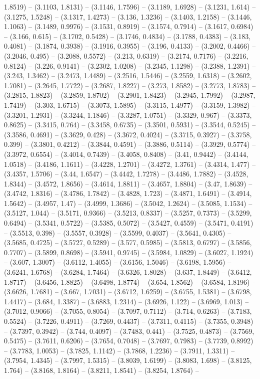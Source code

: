 1.8519) -- (3.1103, 1.8131) -- (3.1146, 1.7596) -- (3.1189, 1.6928) -- (3.1231, 1.614) -- (3.1275, 1.5248) -- (3.1317, 1.4273) -- (3.136, 1.3236) -- (3.1403, 1.2158) -- (3.1446, 1.1063) -- (3.1489, 0.9976) -- (3.1531, 0.8919) -- (3.1574, 0.7914) -- (3.1617, 0.6984) -- (3.166, 0.615) -- (3.1702, 0.5428) -- (3.1746, 0.4834) -- (3.1788, 0.4383) -- (3.183, 0.4081) -- (3.1874, 0.3938) -- (3.1916, 0.3955) -- (3.196, 0.4133) -- (3.2002, 0.4466) -- (3.2046, 0.495) -- (3.2088, 0.5572) -- (3.213, 0.6319) -- (3.2174, 0.7176) -- (3.2216, 0.8124) -- (3.226, 0.9141) -- (3.2302, 1.0208) -- (3.2345, 1.1298) -- (3.2388, 1.2391) -- (3.243, 1.3462) -- (3.2473, 1.4489) -- (3.2516, 1.5446) -- (3.2559, 1.6318) -- (3.2602, 1.7081) -- (3.2645, 1.7722) -- (3.2687, 1.8227) -- (3.273, 1.8582) -- (3.2773, 1.8783) -- (3.2815, 1.8823) -- (3.2859, 1.8702) -- (3.2901, 1.8423) -- (3.2945, 1.7992) -- (3.2987, 1.7419) -- (3.303, 1.6715) -- (3.3073, 1.5895) -- (3.3115, 1.4977) -- (3.3159, 1.3982) -- (3.3201, 1.2931) -- (3.3244, 1.1846) -- (3.3287, 1.0751) -- (3.3329, 0.967) -- (3.3373, 0.8625) -- (3.3415, 0.764) -- (3.3458, 0.6735) -- (3.3501, 0.5931) -- (3.3544, 0.5245) -- (3.3586, 0.4691) -- (3.3629, 0.428) -- (3.3672, 0.4024) -- (3.3715, 0.3927) -- (3.3758, 0.399) -- (3.3801, 0.4212) -- (3.3844, 0.4591) -- (3.3886, 0.5114) -- (3.3929, 0.5774) -- (3.3972, 0.6554) -- (3.4014, 0.7439) -- (3.4058, 0.8408) -- (3.41, 0.9442) -- (3.4144, 1.0518) -- (3.4186, 1.1611) -- (3.4228, 1.2701) -- (3.4272, 1.3761) -- (3.4314, 1.477) -- (3.4357, 1.5706) -- (3.44, 1.6547) -- (3.4442, 1.7278) -- (3.4486, 1.7882) -- (3.4528, 1.8344) -- (3.4572, 1.8656) -- (3.4614, 1.8811) -- (3.4657, 1.8804) -- (3.47, 1.8639) -- (3.4742, 1.8316) -- (3.4786, 1.7842) -- (3.4828, 1.723) -- (3.4871, 1.6491) -- (3.4914, 1.5642) -- (3.4957, 1.47) -- (3.4999, 1.3686) -- (3.5042, 1.2624) -- (3.5085, 1.1534) -- (3.5127, 1.044) -- (3.5171, 0.9366) -- (3.5213, 0.8337) -- (3.5257, 0.7373) -- (3.5299, 0.6494) -- (3.5341, 0.5722) -- (3.5385, 0.5072) -- (3.5427, 0.4559) -- (3.5471, 0.4191) -- (3.5513, 0.398) -- (3.5557, 0.3928) -- (3.5599, 0.4037) -- (3.5641, 0.4305) -- (3.5685, 0.4725) -- (3.5727, 0.5289) -- (3.577, 0.5985) -- (3.5813, 0.6797) -- (3.5856, 0.7707) -- (3.5899, 0.8698) -- (3.5941, 0.9745) -- (3.5984, 1.0829) -- (3.6027, 1.1924) -- (3.607, 1.3007) -- (3.6112, 1.4055) -- (3.6156, 1.5046) -- (3.6198, 1.5956) -- (3.6241, 1.6768) -- (3.6284, 1.7464) -- (3.6326, 1.8028) -- (3.637, 1.8449) -- (3.6412, 1.8717) -- (3.6456, 1.8825) -- (3.6498, 1.8774) -- (3.654, 1.8562) -- (3.6584, 1.8196) -- (3.6626, 1.7681) -- (3.667, 1.7031) -- (3.6712, 1.6259) -- (3.6755, 1.5381) -- (3.6798, 1.4417) -- (3.684, 1.3387) -- (3.6883, 1.2314) -- (3.6926, 1.122) -- (3.6969, 1.013) -- (3.7012, 0.9066) -- (3.7055, 0.8054) -- (3.7097, 0.7112) -- (3.714, 0.6263) -- (3.7183, 0.5524) -- (3.7226, 0.4911) -- (3.7269, 0.4437) -- (3.7311, 0.4115) -- (3.7355, 0.3948) -- (3.7397, 0.3942) -- (3.744, 0.4097) -- (3.7483, 0.441) -- (3.7525, 0.4873) -- (3.7569, 0.5475) -- (3.7611, 0.6206) -- (3.7654, 0.7048) -- (3.7697, 0.7983) -- (3.7739, 0.8992) -- (3.7783, 1.0053) -- (3.7825, 1.1142) -- (3.7868, 1.2236) -- (3.7911, 1.3311) -- (3.7954, 1.4345) -- (3.7997, 1.5315) -- (3.8039, 1.6199) -- (3.8083, 1.698) -- (3.8125, 1.764) -- (3.8168, 1.8164) -- (3.8211, 1.8541) -- (3.8254, 1.8764) -- 